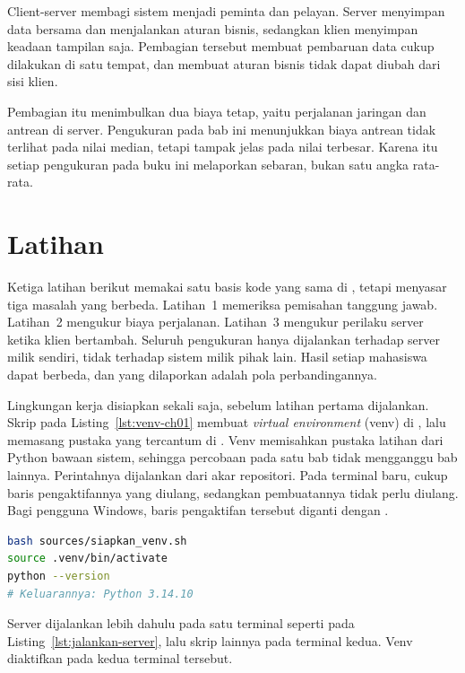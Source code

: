 Client-server membagi sistem menjadi peminta dan pelayan. Server menyimpan data
bersama dan menjalankan aturan bisnis, sedangkan klien menyimpan keadaan
tampilan saja. Pembagian tersebut membuat pembaruan data cukup dilakukan di satu
tempat, dan membuat aturan bisnis tidak dapat diubah dari sisi klien.

Pembagian itu menimbulkan dua biaya tetap, yaitu perjalanan jaringan dan antrean
di server. Pengukuran pada bab ini menunjukkan biaya antrean tidak terlihat pada
nilai median, tetapi tampak jelas pada nilai terbesar. Karena itu setiap
pengukuran pada buku ini melaporkan sebaran, bukan satu angka rata-rata.

\section{Latihan}

Ketiga latihan berikut memakai satu basis kode yang sama di
, tetapi menyasar tiga masalah yang berbeda.
Latihan~1 memeriksa pemisahan tanggung jawab. Latihan~2 mengukur biaya
perjalanan. Latihan~3 mengukur perilaku server ketika klien bertambah. Seluruh
pengukuran hanya dijalankan terhadap server milik sendiri, tidak terhadap
sistem milik pihak lain. Hasil setiap mahasiswa dapat berbeda, dan yang
dilaporkan adalah pola perbandingannya.

Lingkungan kerja disiapkan sekali saja, sebelum latihan pertama dijalankan.
Skrip pada Listing~\ref{lst:venv-ch01} membuat \textit{virtual environment}
(venv) di , lalu memasang pustaka yang tercantum di
. Venv memisahkan pustaka latihan dari Python
bawaan sistem, sehingga percobaan pada satu bab tidak mengganggu bab lainnya.
Perintahnya dijalankan dari akar repositori. Pada terminal baru, cukup baris
pengaktifannya yang diulang, sedangkan pembuatannya tidak perlu diulang. Bagi
pengguna Windows, baris pengaktifan tersebut diganti dengan
.

\begin{lstlisting}[language=bash, caption={Menyiapkan venv sekali sebelum
  seluruh latihan, skrip tersedia di \berkas{sources/siapkan_venv.sh}},
  label=lst:venv-ch01]
bash sources/siapkan_venv.sh
source .venv/bin/activate
python --version
# Keluarannya: Python 3.14.10
\end{lstlisting}

Server dijalankan lebih dahulu pada satu terminal seperti pada
Listing~\ref{lst:jalankan-server}, lalu skrip lainnya pada terminal kedua.
Venv diaktifkan pada kedua terminal tersebut.

